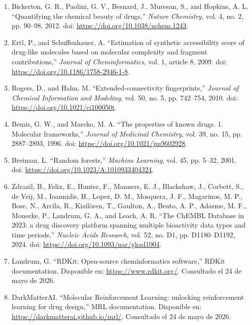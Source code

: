 \documentclass[IB]{TFUOC}%
\begin{document}
\begin{enumerate}
\item \label{ref:bickerton2012} Bickerton, G. R., Paolini, G. V., Besnard, J., Muresan, S., and Hopkins, A. L.  
``Quantifying the chemical beauty of drugs,''  
\textit{Nature Chemistry}, vol. 4, no. 2, pp. 90--98, 2012.  
doi: \url{https://doi.org/10.1038/nchem.1243}.

\item \label{ref:ertl2009} Ertl, P., and Schuffenhauer, A.  
``Estimation of synthetic accessibility score of drug-like molecules based on molecular complexity and fragment contributions,''  
\textit{Journal of Cheminformatics}, vol. 1, article 8, 2009.  
doi: \url{https://doi.org/10.1186/1758-2946-1-8}.

\item \label{ref:rogers2010} Rogers, D., and Hahn, M.  
``Extended-connectivity fingerprints,''  
\textit{Journal of Chemical Information and Modeling}, vol. 50, no. 5, pp. 742--754, 2010.  
doi: \url{https://doi.org/10.1021/ci100050t}.

\item \label{ref:bemis1996} Bemis, G. W., and Murcko, M. A.  
``The properties of known drugs. 1. Molecular frameworks,''  
\textit{Journal of Medicinal Chemistry}, vol. 39, no. 15, pp. 2887--2893, 1996.  
doi: \url{https://doi.org/10.1021/jm9602928}.

\item \label{ref:breiman2001} Breiman, L.  
``Random forests,''  
\textit{Machine Learning}, vol. 45, pp. 5--32, 2001.  
doi: \url{https://doi.org/10.1023/A:1010933404324}.

\item \label{ref:zdrazil2024} Zdrazil, B., Felix, E., Hunter, F., Manners, E. J., Blackshaw, J., Corbett, S., de Veij, M., Ioannidis, H., Lopez, D. M., Mosquera, J. F., Magarinos, M. P., Bosc, N., Arcila, R., Kizilören, T., Gaulton, A., Bento, A. P., Adasme, M. F., Monecke, P., Landrum, G. A., and Leach, A. R.  
``The ChEMBL Database in 2023: a drug discovery platform spanning multiple bioactivity data types and time periods,''  
\textit{Nucleic Acids Research}, vol. 52, no. D1, pp. D1180--D1192, 2024.  
doi: \url{https://doi.org/10.1093/nar/gkad1004}.

\item \label{ref:rdkit} Landrum, G.  
``RDKit: Open-source cheminformatics software,''  
RDKit documentation.  
Disponible en: \url{https://www.rdkit.org/}.  
Consultado el 24 de mayo de 2026.

\item \label{ref:mrl_docs} DarkMatterAI.  
``Molecular Reinforcement Learning: unlocking reinforcement learning for drug design,''  
MRL documentation.  
Disponible en: \url{https://darkmatterai.github.io/mrl/}.  
Consultado el 24 de mayo de 2026.


\end{enumerate}
\end{document}
